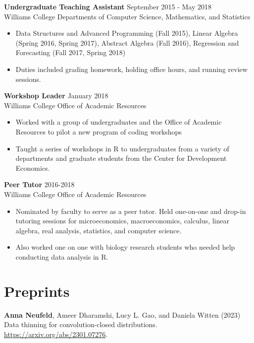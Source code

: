 \documentclass[margin, 10pt]{res} %
\begin{document}
\begin{resume}
{\begin{itemize}
\end{itemize}
{\textbf{Undergraduate Teaching Assistant}} \hfill September 2015 - May 2018 \\
Williams College Departments of Computer Science, Mathematics, and Statistics
\begin{itemize}
\item Data Structures and Advanced Programming (Fall 2015), Linear Algebra (Spring 2016, Spring 2017), Abstract Algebra (Fall 2016), Regression and Forecasting (Fall 2017, Spring 2018)
\item Duties included grading homework, holding office hours, and running review sessions. 
\end{itemize}
{\textbf{Workshop Leader}} \hfill January 2018 \\
Williams College Office of Academic Resources
\begin{itemize}
\item Worked with a group of undergraduates and the Office of Academic Resources to pilot a new program of coding workshops
\item Taught a series of workshops in R to undergraduates from a variety of departments and graduate students from the Center for Development Economics. 
\end{itemize}
{\textbf{Peer Tutor}} \hfill 2016-2018 \\
Williams College Office of Academic Resources
\begin{itemize}
\item Nominated by faculty to serve as a peer tutor. Held one-on-one and drop-in tutoring sessions for microeconomics, macroeconomics, calculus, linear algebra, real analysis, statistics, and computer science.  
\item Also worked one on one with biology research students who needed help conducting data analysis in R. 
\end{itemize}

\section{Preprints} 
\textbf{Anna Neufeld}, Ameer Dharamshi, Lucy L. Gao, and Daniela Witten (2023) Data thinning for convolution-closed distributions. \href{https://arxiv.org/abs/2301.07276}{https://arxiv.org/abs/2301.07276}. 
}
\end{resume}
\end{document}
